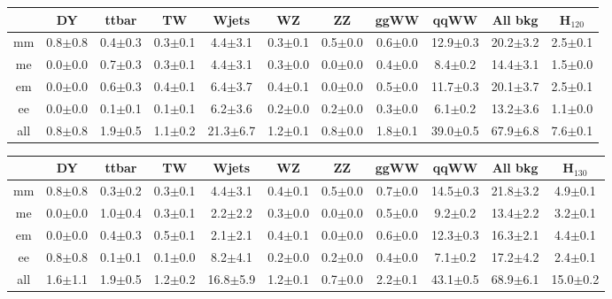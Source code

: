 \begin{table}[!ht]
  \begin{center}
 {\footnotesize
  \begin{tabular} {|c|c|c|c|c|c|c|c|c||c||c|}
\hline
  & DY & ttbar & TW & Wjets & WZ & ZZ & ggWW & qqWW & {\bf All bkg} & {\bf H$_{120}$}\\
  \hline
  \hline
  mm &  0.8$\pm$0.8 &  0.4$\pm$0.3 &  0.3$\pm$0.1 &  4.4$\pm$3.1 &  0.3$\pm$0.1 &  0.5$\pm$0.0 &  0.6$\pm$0.0 & 12.9$\pm$0.3 & 20.2$\pm$3.2 & 2.5$\pm$0.1 \\
  me &  0.0$\pm$0.0 &  0.7$\pm$0.3 &  0.3$\pm$0.1 &  4.4$\pm$3.1 &  0.3$\pm$0.0 &  0.0$\pm$0.0 &  0.4$\pm$0.0 &  8.4$\pm$0.2 & 14.4$\pm$3.1 & 1.5$\pm$0.0 \\
  em &  0.0$\pm$0.0 &  0.6$\pm$0.3 &  0.4$\pm$0.1 &  6.4$\pm$3.7 &  0.4$\pm$0.1 &  0.0$\pm$0.0 &  0.5$\pm$0.0 & 11.7$\pm$0.3 & 20.1$\pm$3.7 & 2.5$\pm$0.1 \\
  ee &  0.0$\pm$0.0 &  0.1$\pm$0.1 &  0.1$\pm$0.1 &  6.2$\pm$3.6 &  0.2$\pm$0.0 &  0.2$\pm$0.0 &  0.3$\pm$0.0 &  6.1$\pm$0.2 & 13.2$\pm$3.6 & 1.1$\pm$0.0 \\
 \hline
 all &  0.8$\pm$0.8 &  1.9$\pm$0.5 &  1.1$\pm$0.2 & 21.3$\pm$6.7 &  1.2$\pm$0.1 &  0.8$\pm$0.0 &  1.8$\pm$0.1 & 39.0$\pm$0.5 & 67.9$\pm$6.8 & 7.6$\pm$0.1 \\
 \hline
  \end{tabular}
  }
 {\footnotesize
  \begin{tabular} {|c|c|c|c|c|c|c|c|c||c||c|}
\hline
  & DY & ttbar & TW & Wjets & WZ & ZZ & ggWW & qqWW & {\bf All bkg} & {\bf H$_{130}$}\\
  \hline
  \hline
  mm & 0.8$\pm$0.8 &  0.3$\pm$0.2 &  0.3$\pm$0.1 &  4.4$\pm$3.1 &  0.4$\pm$0.1 &  0.5$\pm$0.0 &  0.7$\pm$0.0 & 14.5$\pm$0.3 & 21.8$\pm$3.2 & 4.9$\pm$0.1 \\
  me & 0.0$\pm$0.0 &  1.0$\pm$0.4 &  0.3$\pm$0.1 &  2.2$\pm$2.2 &  0.3$\pm$0.0 &  0.0$\pm$0.0 &  0.5$\pm$0.0 &  9.2$\pm$0.2 & 13.4$\pm$2.2 & 3.2$\pm$0.1 \\
  em & 0.0$\pm$0.0 &  0.4$\pm$0.3 &  0.5$\pm$0.1 &  2.1$\pm$2.1 &  0.4$\pm$0.1 &  0.0$\pm$0.0 &  0.6$\pm$0.0 & 12.3$\pm$0.3 & 16.3$\pm$2.1 & 4.4$\pm$0.1 \\
  ee & 0.8$\pm$0.8 &  0.1$\pm$0.1 &  0.1$\pm$0.0 &  8.2$\pm$4.1 &  0.2$\pm$0.0 &  0.2$\pm$0.0 &  0.4$\pm$0.0 &  7.1$\pm$0.2 & 17.2$\pm$4.2 & 2.4$\pm$0.1 \\
 \hline
 all & 1.6$\pm$1.1 &  1.9$\pm$0.5 &  1.2$\pm$0.2 & 16.8$\pm$5.9 &  1.2$\pm$0.1 &  0.7$\pm$0.0 &  2.2$\pm$0.1 & 43.1$\pm$0.5 & 68.9$\pm$6.1 & 15.0$\pm$0.2 \\

\end{tabular}}
\end{center}
\end{table}
